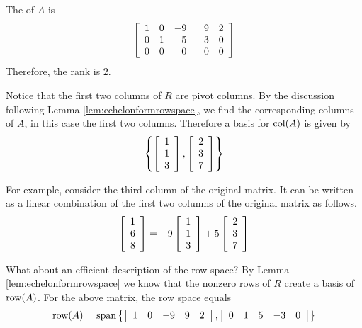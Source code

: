 \begin{solution}
The {\rref} of $A$ is 
\begin{equation*}
\left[ 
\begin{array}{rrrrr}
1 & 0 & -9 & 9 & 2 \\ 
0 & 1 & 5 & -3 & 0 \\ 
0 & 0 & 0 & 0 & 0
\end{array}
\right] 
\end{equation*}
Therefore, the rank is $2$.

Notice that the first two columns of $R$ are pivot columns. By the discussion following Lemma \ref{lem:echelonformrowspace}, we find the corresponding columns of $A$, in this case the first two columns. Therefore a basis for $\mbox{col}(A)$ is given by
\[
\left\{\left[ 
\begin{array}{r}
1 \\ 
1 \\ 
3
\end{array}
\right] , \left[ 
\begin{array}{r}
2 \\ 
3 \\ 
7
\end{array}
\right]
\right\}
\] 

 For
example, consider the third column of the original matrix. It can be written as a linear combination of the first two columns of the original matrix as follows.
\begin{equation*}
\left[ 
\begin{array}{r}
1 \\ 
6 \\ 
8
\end{array}
\right] =-9\left[ 
\begin{array}{r}
1 \\ 
1 \\ 
3
\end{array}
\right] +5\left[ 
\begin{array}{r}
2 \\ 
3 \\ 
7
\end{array}
\right] 
\end{equation*}

What about an efficient description of the row space? By Lemma \ref{lem:echelonformrowspace} we know that the nonzero rows of $R$ create a basis of $\mbox{row}(A)$.  For the above matrix, the row space equals 
\[
\mbox{row}(A) = 
\mbox{span} \left\{
\left[ 
\begin{array}{rrrrr}
1 & 0 & -9 & 9 & 2
\end{array}
\right], \left[ 
\begin{array}{rrrrr}
0 & 1 & 5 & -3 & 0
\end{array}
\right]
\right\}
\]
\end{solution}

